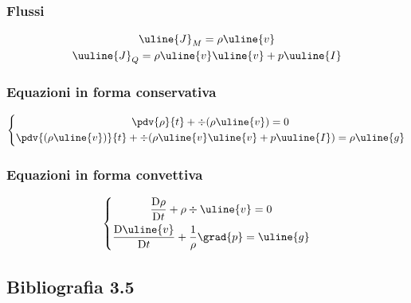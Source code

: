 \subsubsection{Flussi}
%
	\begin{equation*}
		\begin{gathered}
			\uline{J}_M = \rho \uline{v}\\
			\uuline{J}_Q = \rho \uline{v} \uline{v} + p \uuline{I}
		\end{gathered}
	\end{equation*}
%

\subsubsection{Equazioni in forma conservativa}
%
	\begin{equation*}
		\left\{
			\begin{gathered}
				\pdv{\rho}{t} + \div{(\rho \uline{v})} = 0\\
				\pdv{(\rho \uline{v})}{t} + \div{(\rho \uline{v} \uline{v} + p \uuline{I})} = \rho \uline{g}
			\end{gathered}
		\right.
	\end{equation*}
%

\subsubsection{Equazioni in forma convettiva}
%
	\begin{equation*}
		\left\{
			\begin{gathered}
				\frac{\mathrm{D} \rho}{\mathrm{D} t} + \rho \div{\uline{v}} = 0\\
				\frac{\mathrm{D} \uline{v}}{\mathrm{D} t} + \frac{1}{\rho} \grad{p} = \uline{g}
			\end{gathered}
		\right.
	\end{equation*}
%

\subsection*{Bibliografia 3.5}
\cite[Cap.\ 10.3]{CengelCimbala}\\
\cite[Cap.\ 5.3, 5.4, 5.5, 5.10]{PnueliGutfinger}